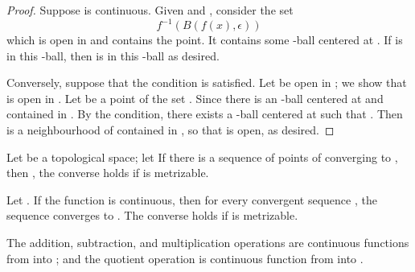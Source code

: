 \begin{proof}
      Suppose  is continuous. Given  and \mt{
            \epsilon
      }, consider the set
      \begin{equation*}
            f^{-1}(B(f(x),\epsilon))
      \end{equation*}
      which is open in  and contains the point. It contains some \mt{
            \delta
      }-ball  centered at . If  is in this \mt{
            \delta
      }-ball, then  is in this \mt{
            \delta
      }-ball as desired.

      Conversely, suppose that the \mt{
            \epsilon-\delta
      } condition is satisfied. Let  be open in ; we show that  is open in . Let  be a point of the set . Since  there is an \mt{
            \epsilon
      }-ball  centered at  and contained in . By the \mt{
            \epsilon-\delta
      } condition, there exists a \mt{
            \delta
      }-ball centered at  such that . Then  is a neighbourhood of  contained in , so that  is open, as desired.
\end{proof}

\begin{lemma}\label{def:TheSequenceLemma}\omitObviuos
      Let  be a topological space; let  If there is a sequence of points of  converging to , then , the converse holds if  is metrizable.
\end{lemma}

\begin{theorem}\omitObviuos
      Let . If the function  is continuous, then for every convergent sequence , the sequence  converges to . The converse holds if  is metrizable.
\end{theorem}

\begin{lemma}\omitObviuos
      The addition, subtraction, and multiplication operations are continuous functions from  into ; and the quotient operation is continuous function from  into .
\end{lemma}

